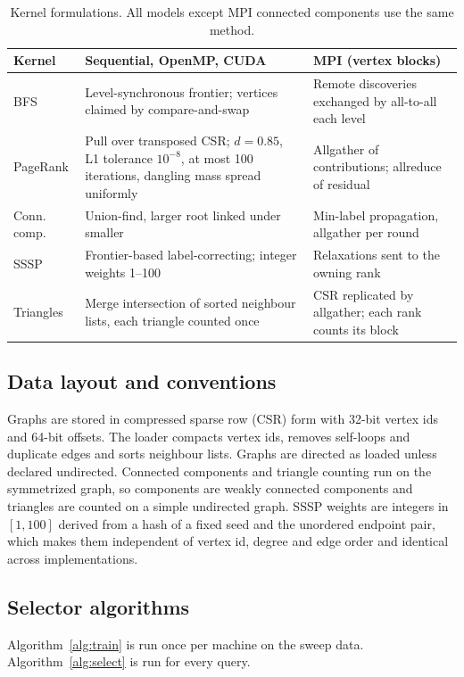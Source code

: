 \documentclass[conference]{IEEEtran}
\begin{document}
\begin{table}[!tb]
\caption{Kernel formulations. All models except MPI connected components use the same method.}
\label{tab:alg}
\centering\footnotesize
\begin{tabular}{@{}p{}p{}p{}@{}}
\toprule
Kernel & Sequential, OpenMP, CUDA & MPI (vertex blocks) \\
\midrule
BFS & Level-synchronous frontier; vertices claimed by compare-and-swap & Remote discoveries exchanged by all-to-all each level \\
PageRank & Pull over transposed CSR; $d{=}0.85$, L1 tolerance $10^{-8}$, at most 100 iterations, dangling mass spread uniformly & Allgather of contributions; allreduce of residual \\
Conn. comp. & Union-find, larger root linked under smaller & Min-label propagation, allgather per round \\
SSSP & Frontier-based label-correcting; integer weights 1--100 & Relaxations sent to the owning rank \\
Triangles & Merge intersection of sorted neighbour lists, each triangle counted once & CSR replicated by allgather; each rank counts its block \\
\bottomrule
\end{tabular}
\end{table}

\subsection{Data layout and conventions}
Graphs are stored in compressed sparse row (CSR) form with 32-bit vertex ids and 64-bit offsets. The loader compacts vertex ids, removes self-loops and duplicate edges and sorts neighbour lists. Graphs are directed as loaded unless declared undirected. Connected components and triangle counting run on the symmetrized graph, so components are weakly connected components and triangles are counted on a simple undirected graph. SSSP weights are integers in $[1,100]$ derived from a hash of a fixed seed and the unordered endpoint pair, which makes them independent of vertex id, degree and edge order and identical across implementations.

\subsection{Selector algorithms}
Algorithm~\ref{alg:train} is run once per machine on the sweep data. Algorithm~\ref{alg:select} is run for every query.
\end{document}
